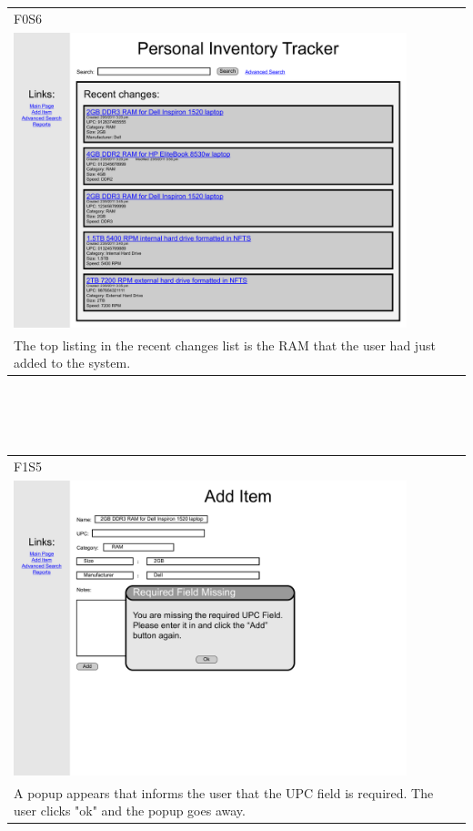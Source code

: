 \documentclass{article}
\begin{document}
~\\
~\\
\begin{tabular}{ p{4.5in} }
F0S6\\
\includegraphics[keepaspectratio, width=4.5in]{addItemF0S6.pdf} \\
The top listing in the recent changes list is the RAM that the user had just added to the system.
\end{tabular}\\
~\\
~\\
\begin{tabular}{ p{4.5in} }
F1S5\\
\includegraphics[keepaspectratio, width=4.5in]{addItemF1S5.pdf} \\
A popup appears that informs the user that the UPC field is required. The user clicks "ok" and the popup goes away.
\end{tabular}\\
\end{document}
